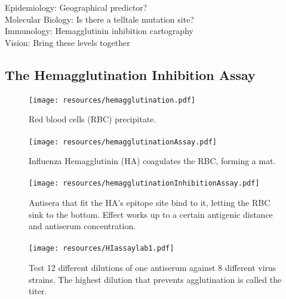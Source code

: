 \documentclass{beamer}
\begin{document}
\begin{darkframes}
\begin{frame}{\secname}

      \vfill
      Epidemiology: Geographical predictor?\\[2mm]

      Molecular Biology: Is there a telltale mutation site?\\[2mm]

      Immunology: Hemagglutinin inhibition cartography\\[2mm]

      \Large Vision: Bring these levels together
    \end{frame}




    \subsection{The Hemagglutination Inhibition Assay}

    \begin{frame}{\subsecname}
      \framesubtitle{}
      \begin{figure}
        \texttt{[image: resources/hemagglutination.pdf]}
        \caption{Red blood cells (RBC) precipitate.}
        \label{1}
      \end{figure}
    \end{frame}

    \begin{frame}{\subsecname}
      \framesubtitle{}
      \begin{figure}
        \texttt{[image: resources/hemagglutinationAssay.pdf]}
        \caption{Influenza Hemagglutinin (HA) coagulates the RBC, forming a mat.}
      \end{figure}
    \end{frame}

    \begin{frame}{\subsecname}
      \framesubtitle{}
      \begin{figure}
        \texttt{[image: resources/hemagglutinationInhibitionAssay.pdf]}
        \caption{Antisera that fit the HA's epitope site bind to it, letting the RBC sink to the bottom. Effect works up to a certain antigenic distance and antiserum concentration.}
      \end{figure}
    \end{frame}

    \begin{frame}{\subsecname}
      \framesubtitle{}
      \begin{figure}
        \texttt{[image: resources/HIassaylab1.pdf]}
        \caption{\footnotesize Test 12 different dilutions of one antiserum against 8 different virus strains. The highest dilution that prevents agglutination is called the titer.}
      \end{figure}
    \end{frame}


\end{darkframes}
\end{document}
